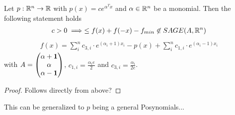 \documentclass[./main.tex]{subfiles}
\begin{document}
\begin{thm}
Let $p: \mathbb{R}^n \rightarrow \mathbb{R}$ with $p(x) = c e^{\alpha^T x}$ and $\alpha \in \mathbb{R}^n$ be a monomial. Then the following statement holds
\begin{align*}
c> 0 \implies \leq f(x)+f(-x)-f_{min} \not\in SAGE(A,\mathbb{R}^n)
\end{align*}
\begin{align*}
f(x) = \sum_i^n c_{3,i} \cdot e^{(\alpha_i +1) x_i} -p(x) + \sum_i^n c_{1,i} \cdot e^{(\alpha_i -1) x_i}
\end{align*}
with $A = \begin{pmatrix}\alpha +\mathbf{1}\\ \alpha \\ \alpha -\mathbf{1} \end{pmatrix}$, $c_{1,i} = \frac {\alpha_i e} {2} $ and $c_{3,i} = \frac {\alpha_i} {2 e}$.
\begin{proof}
Follows directly from above?
\end{proof}
\end{thm}
This can be generalized to $p$ being a general Posynomials... 
\end{document}

